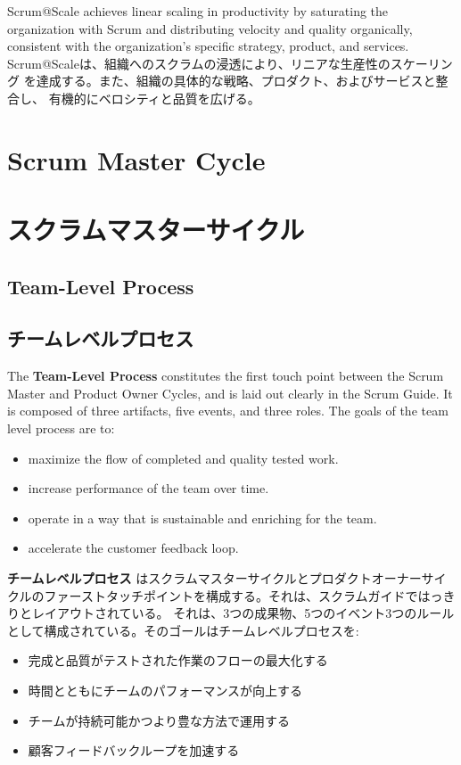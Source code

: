 \documentclass[12pt,a4paper,parskip=full]{scrartcl}
\begin{document}
Scrum@Scale achieves linear scaling in productivity by saturating the
organization with Scrum and distributing velocity and quality organically,
consistent with the organization's specific strategy, product, and services.
\fi
Scrum@Scaleは、組織へのスクラムの浸透により、リニアな生産性のスケーリング
を達成する。また、組織の具体的な戦略、プロダクト、およびサービスと整合し、
有機的にベロシティと品質を広げる。

\section{Scrum Master Cycle}
\fi
\section{スクラムマスターサイクル}
\subsection{Team-Level Process}
\fi
\subsection{チームレベルプロセス}
The \textbf{Team-Level Process} constitutes the first touch point between the Scrum Master and Product Owner Cycles, and is laid out clearly in the Scrum Guide. It
is composed of three artifacts, five events, and three roles. The goals of
the team level process are to:
\begin{itemize}
\item maximize the flow of completed and quality tested work.
\item increase performance of the team over time.
\item operate in a way that is sustainable and enriching for the team.
\item accelerate the customer feedback loop.
\end{itemize}
\fi
\textbf{チームレベルプロセス} はスクラムマスターサイクルとプロダクトオーナーサイクルのファーストタッチポイントを構成する。それは、スクラムガイドではっきりとレイアウトされている。
それは、3つの成果物、5つのイベント3つのルールとして構成されている。そのゴールはチームレベルプロセスを:
\begin{itemize}
\item 完成と品質がテストされた作業のフローの最大化する
\item 時間とともにチームのパフォーマンスが向上する
\item チームが持続可能かつより豊な方法で運用する
\item 顧客フィードバックループを加速する
\end{itemize}
\end{document}
